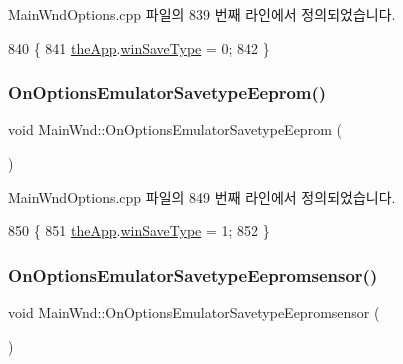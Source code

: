 Main\+Wnd\+Options.\+cpp 파일의 839 번째 라인에서 정의되었습니다.


\begin{DoxyCode}
840 \{
841   \mbox{\hyperlink{_v_b_a_8cpp_a8095a9d06b37a7efe3723f3218ad8fb3}{theApp}}.\mbox{\hyperlink{class_v_b_a_a70060f88010280739406c87ef66d036a}{winSaveType}} = 0;
842 \}
\end{DoxyCode}
\mbox{\label{class_main_wnd_ab0b7f0078bb9327c33fa04501e971e57}} 
\subsubsection{\texorpdfstring{On\+Options\+Emulator\+Savetype\+Eeprom()}{OnOptionsEmulatorSavetypeEeprom()}}
{\footnotesize\ttfamily void Main\+Wnd\+::\+On\+Options\+Emulator\+Savetype\+Eeprom (\begin{DoxyParamCaption}{ }\end{DoxyParamCaption})\hspace{0.3cm}{\ttfamily [protected]}}



Main\+Wnd\+Options.\+cpp 파일의 849 번째 라인에서 정의되었습니다.


\begin{DoxyCode}
850 \{
851   \mbox{\hyperlink{_v_b_a_8cpp_a8095a9d06b37a7efe3723f3218ad8fb3}{theApp}}.\mbox{\hyperlink{class_v_b_a_a70060f88010280739406c87ef66d036a}{winSaveType}} = 1;
852 \}
\end{DoxyCode}
\mbox{\label{class_main_wnd_ac623d029d6d33c1c8e22fbb671725558}} 
\subsubsection{\texorpdfstring{On\+Options\+Emulator\+Savetype\+Eepromsensor()}{OnOptionsEmulatorSavetypeEepromsensor()}}
{\footnotesize\ttfamily void Main\+Wnd\+::\+On\+Options\+Emulator\+Savetype\+Eepromsensor (\begin{DoxyParamCaption}{ }\end{DoxyParamCaption})\hspace{0.3cm}{\ttfamily [protected]}}



